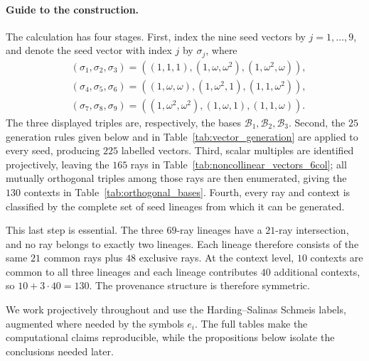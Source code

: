 \documentclass[%
  reprint,
  superscriptaddress,
  showkeys,
  amsmath,amssymb,
  aps,pra,
  longbibliography,
  floatfix,
  x11names
]{revtex4-2}
\begin{document}
\paragraph*{Guide to the construction.}
The calculation has four stages.  
First, index the nine seed vectors 
by $j=1,\ldots,9$, and denote 
the seed vector with index $j$ by 
$\sigma_j$, where
\[
\begin{aligned}
&\ensuremath{(\sigma_1,\sigma_2,\sigma_3)=((1,1,1),(1,\omega,\omega^2),(1,\omega^2,\omega))},\\
&\ensuremath{(\sigma_4,\sigma_5,\sigma_6)=((1,\omega,\omega),(1,\omega^2,1),(1,1,\omega^2))},\\
&\ensuremath{(\sigma_7,\sigma_8,\sigma_9)=((1,\omega^2,\omega^2),(1,\omega,1),(1,1,\omega))}.
\end{aligned}
\]
The three displayed triples are, respectively, the bases \(\mathcal B_1,\mathcal B_2,\mathcal B_3\).
Second, the $25$ generation rules given below and in Table~\ref{tab:vector_generation} are applied to every seed, producing $225$ labelled vectors.  Third, scalar multiples are identified projectively, leaving the $165$ rays in Table~\ref{tab:noncollinear_vectors_6col}; all mutually orthogonal triples among those rays are then enumerated, giving the $130$ contexts in Table~\ref{tab:orthogonal_bases}.  Fourth, every ray and context is classified by the complete set of seed lineages from which it can be generated.

This last step is essential.  The three $69$-ray lineages have a $21$-ray intersection, and no ray belongs to exactly two lineages.  Each lineage therefore consists of the same $21$ common rays plus $48$ exclusive rays.  At the context level, $10$ contexts are common to all three lineages and each lineage contributes $40$ additional contexts, so $10+3\cdot40=130$.  The provenance structure is therefore symmetric.

We work projectively throughout and use the Harding--Salinas Schmeis labels, augmented where needed by the symbols $e_i$.  The full tables make the computational claims reproducible, while the propositions below isolate the conclusions needed later.
\end{document}
